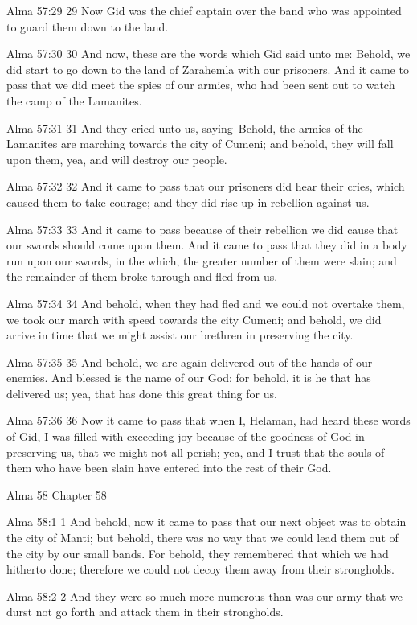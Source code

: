Alma 57:29
 29 Now Gid was the chief captain over the band who was appointed
to guard them down to the land.

Alma 57:30
 30 And now, these are the words which Gid said unto me: Behold,
we did start to go down to the land of Zarahemla with our
prisoners. And it came to pass that we did meet the spies of our
armies, who had been sent out to watch the camp of the Lamanites.

Alma 57:31
 31 And they cried unto us, saying--Behold, the armies of the
Lamanites are marching towards the city of Cumeni; and behold,
they will fall upon them, yea, and will destroy our people.

Alma 57:32
 32 And it came to pass that our prisoners did hear their cries,
which caused them to take courage; and they did rise up in
rebellion against us.

Alma 57:33
 33 And it came to pass because of their rebellion we did cause
that our swords should come upon them. And it came to pass that
they did in a body run upon our swords, in the which, the greater
number of them were slain; and the remainder of them broke
through and fled from us.

Alma 57:34
 34 And behold, when they had fled and we could not overtake
them, we took our march with speed towards the city Cumeni; and
behold, we did arrive in time that we might assist our brethren
in preserving the city.

Alma 57:35
 35 And behold, we are again delivered out of the hands of our
enemies. And blessed is the name of our God; for behold, it is
he that has delivered us; yea, that has done this great thing for
us.

Alma 57:36
 36 Now it came to pass that when I, Helaman, had heard these
words of Gid, I was filled with exceeding joy because of the
goodness of God in preserving us, that we might not all perish;
yea, and I trust that the souls of them who have been slain have
entered into the rest of their God.

Alma 58
Chapter 58

Alma 58:1
 1 And behold, now it came to pass that our next object was to
obtain the city of Manti; but behold, there was no way that we
could lead them out of the city by our small bands. For behold,
they remembered that which we had hitherto done; therefore we
could not decoy them away from their strongholds.

Alma 58:2
 2 And they were so much more numerous than was our army that we
durst not go forth and attack them in their strongholds.

